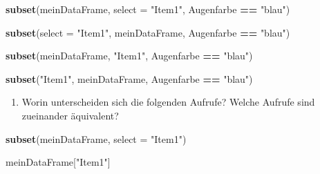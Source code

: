 \documentclass[12pt,]{tufte-book}
\newenvironment{Shaded}{\begin{snugshade}}{\end{snugshade}}
\newcommand{\KeywordTok}[1]{\textcolor[rgb]{0.13,0.29,0.53}{\textbf{#1}}}
\newcommand{\DataTypeTok}[1]{\textcolor[rgb]{0.13,0.29,0.53}{#1}}
\newcommand{\StringTok}[1]{\textcolor[rgb]{0.31,0.60,0.02}{#1}}
\newcommand{\OperatorTok}[1]{\textcolor[rgb]{0.81,0.36,0.00}{\textbf{#1}}}
\newcommand{\NormalTok}[1]{#1}
\providecommand{\tightlist}{%
  \setlength{\itemsep}{0pt}\setlength{\parskip}{0pt}}
\theoremstyle{definition}
\theoremstyle{definition}
\theoremstyle{definition}
\theoremstyle{remark}
\begin{document}
\begin{Shaded}
\begin{Highlighting}[]
\KeywordTok{subset}\NormalTok{(meinDataFrame, }\DataTypeTok{select =} \StringTok{"Item1"}\NormalTok{, Augenfarbe }\OperatorTok{==}\StringTok{ "blau"}\NormalTok{)}
\end{Highlighting}
\end{Shaded}

\begin{Shaded}
\begin{Highlighting}[]
\KeywordTok{subset}\NormalTok{(}\DataTypeTok{select =} \StringTok{"Item1"}\NormalTok{, meinDataFrame, Augenfarbe }\OperatorTok{==}\StringTok{ "blau"}\NormalTok{)}
\end{Highlighting}
\end{Shaded}

\begin{Shaded}
\begin{Highlighting}[]
\KeywordTok{subset}\NormalTok{(meinDataFrame, }\StringTok{"Item1"}\NormalTok{, Augenfarbe }\OperatorTok{==}\StringTok{ "blau"}\NormalTok{)}
\end{Highlighting}
\end{Shaded}

\begin{Shaded}
\begin{Highlighting}[]
\KeywordTok{subset}\NormalTok{(}\StringTok{"Item1"}\NormalTok{, meinDataFrame, Augenfarbe }\OperatorTok{==}\StringTok{ "blau"}\NormalTok{)}
\end{Highlighting}
\end{Shaded}

\begin{enumerate}
\def\labelenumi{\arabic{enumi}.}
\setcounter{enumi}{1}
\tightlist
\item
  Worin unterscheiden sich die folgenden Aufrufe? Welche Aufrufe sind
  zueinander äquivalent?
\end{enumerate}

\begin{Shaded}
\begin{Highlighting}[]
\KeywordTok{subset}\NormalTok{(meinDataFrame, }\DataTypeTok{select =} \StringTok{"Item1"}\NormalTok{)}
\end{Highlighting}
\end{Shaded}

\begin{Shaded}
\begin{Highlighting}[]
\NormalTok{meinDataFrame[}\StringTok{"Item1"}\NormalTok{]}
\end{Highlighting}
\end{Shaded}
\end{document}
